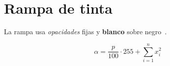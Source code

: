 \documentclass[11pt]{article}
\newcommand{\ink}[1]{\textbf{#1}}
\begin{document}
\section{Rampa de tinta}
La rampa usa \emph{opacidades} fijas y \ink{blanco} sobre negro~\cite{enki}.

\begin{equation}
  \alpha = \frac{p}{100} \cdot 255 + \sum_{i=1}^{n} x_i^2
\end{equation}
\end{document}
